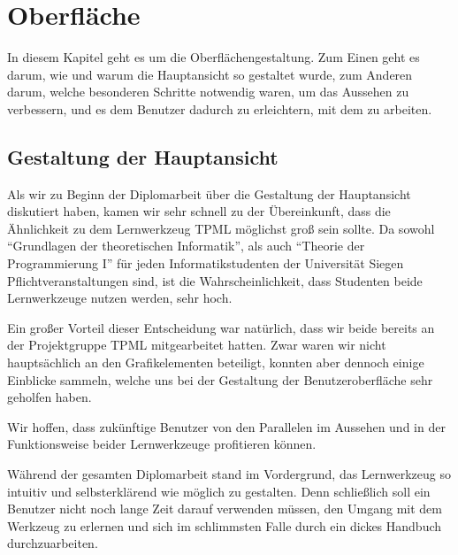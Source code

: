 



\chapter{Oberfläche}\label{GUI}

In diesem Kapitel geht es um die Oberflächengestaltung. Zum Einen geht es darum,
wie und warum die Hauptansicht so gestaltet wurde, zum Anderen darum, welche
besonderen Schritte notwendig waren, um das Aussehen zu verbessern, und es dem
Benutzer dadurch zu erleichtern, mit dem \gtitool zu arbeiten.\vspace{10pt}


\section{Gestaltung der Hauptansicht}\label{GUIMain}

Als wir zu Beginn der Diplomarbeit über die Gestaltung der Hauptansicht
diskutiert haben, kamen wir sehr schnell zu der Übereinkunft, dass die
Ähnlichkeit zu dem Lernwerkzeug TPML möglichst groß sein sollte. Da sowohl
"`Grundlagen der theoretischen Informatik"', als auch "`Theorie der
Programmierung I"' für jeden Informatikstudenten der Universität Siegen
Pflichtveranstaltungen sind, ist die Wahrscheinlichkeit, dass Studenten beide
Lernwerkzeuge nutzen werden, sehr hoch.\vspace{10pt}

Ein großer Vorteil dieser Entscheidung war natürlich, dass wir beide
bereits an der Projektgruppe TPML mitgearbeitet hatten. Zwar waren wir nicht
hauptsächlich an den Grafikelementen beteiligt, konnten aber dennoch einige
Einblicke sammeln, welche uns bei der Gestaltung der Benutzeroberfläche sehr
geholfen haben.\vspace{10pt}

Wir hoffen, dass zukünftige Benutzer von den Parallelen im Aussehen
und in der Funktionsweise beider Lernwerkzeuge profitieren können.\vspace{10pt}

Während der gesamten Diplomarbeit stand im Vordergrund, das Lernwerkzeug so
intuitiv und selbsterklärend wie möglich zu gestalten. Denn schließlich soll
ein Benutzer nicht noch lange Zeit darauf verwenden müssen, den Umgang mit dem
Werkzeug zu erlernen und sich im schlimmsten Falle durch ein dickes Handbuch
durchzuarbeiten.\vspace{10pt}

